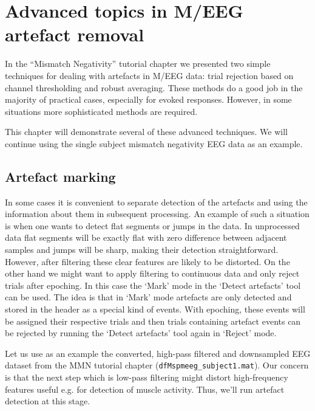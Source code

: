\chapter{Advanced topics in M/EEG artefact removal \label{Chap:data:meeg_artefact}}

In the ``Mismatch Negativity'' tutorial chapter we presented two simple techniques for dealing with artefacts in M/EEG data: trial rejection based on channel thresholding and robust averaging. These methods do a good job in the majority of practical cases, especially for evoked responses. However, in some situations more sophisticated methods are required. 

This chapter will demonstrate several of these advanced techniques. We will continue using the single subject mismatch negativity EEG data as an example.

\section{Artefact marking}

In some cases it is convenient to separate detection of the artefacts and using the information about them in subsequent processing. An example of such a situation is when one wants to detect flat segments or jumps in the data. In unprocessed data flat segments will be exactly flat with zero difference between adjacent samples and jumps will be sharp, making their detection straightforward. However, after filtering these clear features are likely to be distorted. On the other hand we might want to apply filtering to continuous data and only reject trials after epoching. In this case the `Mark' mode in the `Detect artefacts' tool can be used. The idea is that in `Mark' mode artefacts are only detected and stored in the header as a special kind of events. With epoching, these events will be assigned their respective trials and then trials containing artefact events can be rejected by running the `Detect artefacts' tool again in `Reject' mode. 

Let us use as an example the converted, high-pass filtered and downsampled EEG dataset from the MMN tutorial chapter (\texttt{dfMspmeeg\_subject1.mat}). Our concern is that the next step which is low-pass filtering might distort high-frequency features useful e.g. for detection of muscle activity. Thus, we'll run artefact detection at this stage. 

